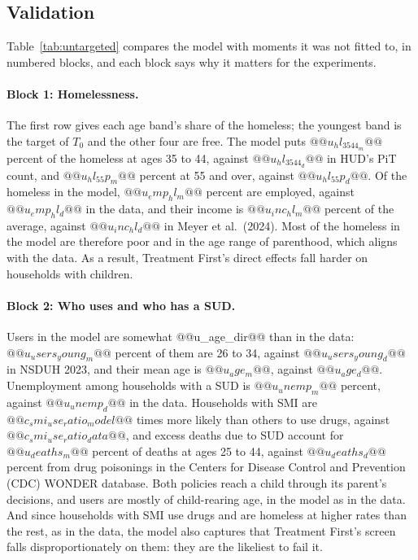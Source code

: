 \documentclass[10pt]{article}
\begin{document}
\subsection{Validation}\label{sec:fvalid}

Table~\ref{tab:untargeted} compares the model with moments it was not fitted to, in numbered blocks, and each block says why it matters for the experiments.

\paragraph{Block 1: Homelessness.} The first row gives each age band's share of the homeless; the youngest band is the target of $T_0$ and the other four are free. The model puts $@@u_hl_3544_m@@$ percent of the homeless at ages 35 to 44, against $@@u_hl_3544_d@@$ in HUD's PiT count, and $@@u_hl_55p_m@@$ percent at 55 and over, against $@@u_hl_55p_d@@$. Of the homeless in the model, $@@u_emp_hl_m@@$ percent are employed, against $@@u_emp_hl_d@@$ in the data, and their income is $@@u_inc_hl_m@@$ percent of the average, against $@@u_inc_hl_d@@$ in Meyer et al.\ (2024).   Most of the homeless in the model are therefore poor and in the age range of parenthood, which aligns with the data.  As a result, Treatment First's direct effects fall harder on households with children.

 

\paragraph{Block 2: Who uses and who has a SUD.} Users in the model are somewhat @@u_age_dir@@ than in the data: $@@u_users_young_m@@$ percent of them are 26 to 34, against $@@u_users_young_d@@$ in NSDUH 2023, and their mean age is $@@u_age_m@@$, against $@@u_age_d@@$. Unemployment among households with a SUD is $@@u_unemp_m@@$ percent, against $@@u_unemp_d@@$ in the data. Households with SMI are $@@c_smi_use_ratio_model@@$ times more likely than others to use drugs, against $@@c_smi_use_ratio_data@@$, and excess deaths due to SUD account for $@@u_deaths_m@@$ percent of deaths at ages 25 to 44, against $@@u_deaths_d@@$ percent from drug poisonings in the Centers for Disease Control and Prevention (CDC) WONDER database. Both policies reach a child through its parent's decisions, and users are mostly of child-rearing age, in the model as in the data. And since households with SMI use drugs and are homeless at higher rates than the rest, as in the data, the model also captures that Treatment First's screen falls disproportionately on them: they are the likeliest to fail it.
\end{document}
